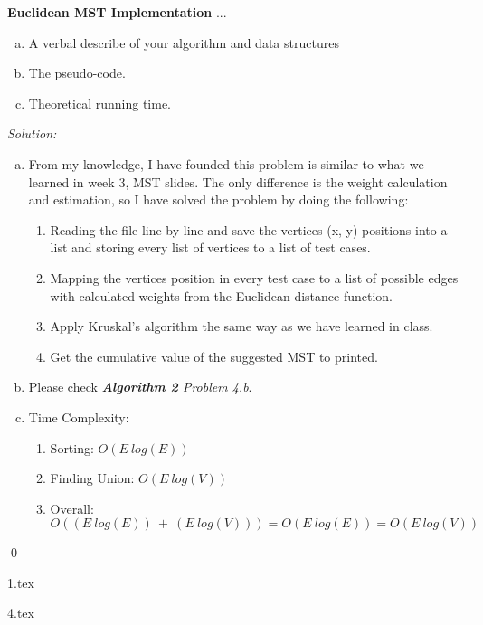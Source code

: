 \documentclass[12pt]{article}
\newenvironment{problem}[2][Problem]{\begin{trivlist}
\item[\hskip \labelsep {\bfseries #1}\hskip \labelsep {\bfseries #2.}]}{\end{trivlist}}
\newenvironment{sol}
    {\emph{Solution:}
    }
    {
    \qed
    }
\begin{document}
\begin{problem}{4} \textbf{Euclidean MST Implementation} ...
\begin{enumerate}[(a)]
    \item A verbal describe of your algorithm and data structures
    \item The pseudo-code.
    \item Theoretical running time.
\end{enumerate}
\end{problem}
\begin{sol}
\begin{enumerate}[(a)]
    \item From my knowledge, I have founded this problem is similar to what we learned in week 3, MST slides. The only difference is the weight calculation and estimation, so I have solved the problem by doing the following:
    \begin{enumerate}
        \item Reading the file line by line and save the vertices (x, y) positions into a list and storing every list of vertices to a list of test cases.
        \item Mapping the vertices position in every test case to a list of possible edges with calculated weights from the Euclidean distance function.
        \item Apply Kruskal's algorithm the same way as we have learned in class.
        \item Get the cumulative value of the suggested MST to printed.
    \end{enumerate}
    \item Please check \textit{\textbf{Algorithm 2} Problem 4.b}.
    \item Time Complexity:
        \begin{enumerate}
        \item Sorting: $O(E\ log(E))$
        \item Finding Union: $O(E\ log(V))$ 
        \item Overall: $O((E\ log(E))\ +\ (E\ log(V)))=O(E\ log(E))=O(E\ log(V))$
    \end{enumerate}
\end{enumerate}
\end{sol}
\newpage

\begin{algorithm}
\caption{Problem 1}
\label{alg:waypointAlgo}
\begin{algorithmic}[1]
{1.tex}
\end{algorithmic}
\end{algorithm}


\begin{algorithm}
\caption{Problem 4.b}
\label{alg:waypointAlgo}
\begin{algorithmic}[1]
{4.tex}
\end{algorithmic}
\end{algorithm}
\end{document}
